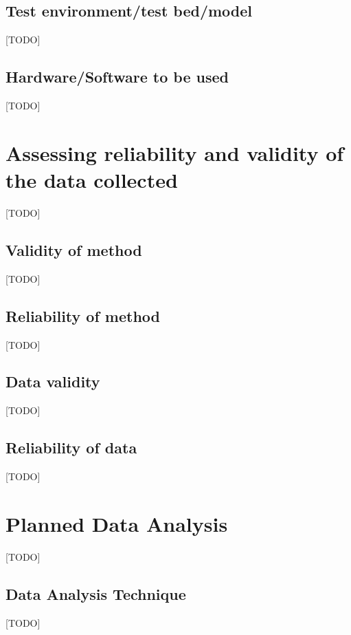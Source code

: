\subsection{Test environment/test bed/model}
[TODO]

\subsection{Hardware/Software to be used}
[TODO]

\section{Assessing reliability and validity of the data collected} \label{sec:assessingReliability}
[TODO]

\subsection{Validity of method}
[TODO]

\subsection{Reliability of method}
[TODO]

\subsection{Data validity}
[TODO]

\subsection{Reliability of data}
[TODO]

\section{Planned Data Analysis} \label{sec:plannedDataAnalysis}
[TODO]


\subsection{Data Analysis Technique}
[TODO]

